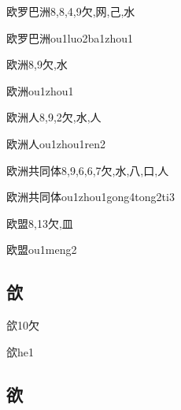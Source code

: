 \begin{Entry}{欧罗巴洲}{8,8,4,9}{⽋,⽹,⼰,⽔}
  \begin{Phonetics}{欧罗巴洲}{ou1luo2ba1zhou1}
  \end{Phonetics}
\end{Entry}

\begin{Entry}{欧洲}{8,9}{⽋,⽔}
  \begin{Phonetics}{欧洲}{ou1zhou1}
  \end{Phonetics}
\end{Entry}

\begin{Entry}{欧洲人}{8,9,2}{⽋,⽔,⼈}
  \begin{Phonetics}{欧洲人}{ou1zhou1ren2}
  \end{Phonetics}
\end{Entry}

\begin{Entry}{欧洲共同体}{8,9,6,6,7}{⽋,⽔,⼋,⼝,⼈}
  \begin{Phonetics}{欧洲共同体}{ou1zhou1gong4tong2ti3}
  \end{Phonetics}
\end{Entry}

\begin{Entry}{欧盟}{8,13}{⽋,⽫}
  \begin{Phonetics}{欧盟}{ou1meng2}
  \end{Phonetics}
\end{Entry}

\subsection*{欱}

\begin{Entry}{欱}{10}{⽋}
  \begin{Phonetics}{欱}{he1}
  \end{Phonetics}
\end{Entry}

\subsection*{欲}

